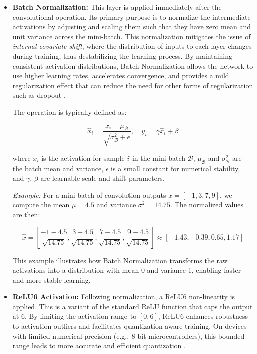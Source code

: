 \begin{itemize}

    \item \textbf{Batch Normalization:} This layer is applied immediately after the convolutional operation. Its primary purpose is to normalize the intermediate activations by adjusting and scaling them such that they have zero mean and unit variance across the mini-batch. This normalization mitigates the issue of \textit{internal covariate shift}, where the distribution of inputs to each layer changes during training, thus destabilizing the learning process. By maintaining consistent activation distributions, Batch Normalization allows the network to use higher learning rates, accelerates convergence, and provides a mild regularization effect that can reduce the need for other forms of regularization such as dropout \cite{BatchNorm}.
    
    The operation is typically defined as:

    \[
    \hat{x}_i = \frac{x_i - \mu_{\mathcal{B}}}{\sqrt{\sigma^2_{\mathcal{B}} + \epsilon}}, \quad y_i = \gamma \hat{x}_i + \beta
    \]
    
    where $x_i$ is the activation for sample $i$ in the mini-batch $\mathcal{B}$, $\mu_{\mathcal{B}}$ and $\sigma^2_{\mathcal{B}}$ are the batch mean and variance, $\epsilon$ is a small constant for numerical stability, and $\gamma$, $\beta$ are learnable scale and shift parameters.
    
    \textit{Example:} For a mini-batch of convolution outputs $x = [-1, 3, 7, 9]$, we compute the mean $\mu = 4.5$ and variance $\sigma^2 = 14.75$. The normalized values are then:
    
    \[
    \hat{x} = \left[\frac{-1 - 4.5}{\sqrt{14.75}}, \frac{3 - 4.5}{\sqrt{14.75}}, \frac{7 - 4.5}{\sqrt{14.75}}, \frac{9 - 4.5}{\sqrt{14.75}}\right] \approx [-1.43, -0.39, 0.65, 1.17]
    \]
    
    This example illustrates how Batch Normalization transforms the raw activations into a distribution with mean 0 and variance 1, enabling faster and more stable learning.

    
    \item \textbf{ReLU6 Activation:} Following normalization, a ReLU6 non-linearity is applied. This is a variant of the standard ReLU function that caps the output at 6. By limiting the activation range to $[0, 6]$, ReLU6 enhances robustness to activation outliers and facilitates quantization-aware training. On devices with limited numerical precision (e.g., 8-bit microcontrollers), this bounded range leads to more accurate and efficient quantization \cite{ConvNetworksMobileNets}.


\end{itemize}
